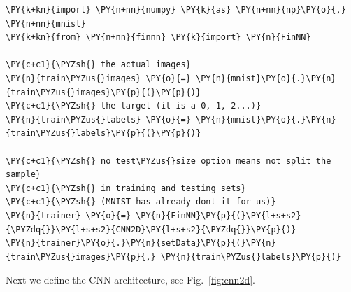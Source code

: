 \begin{codebox}[breakable, size=fbox, boxrule=1pt, pad at break*=1mm,colback=cellbackground, colframe=cellborder]
\begin{Verbatim}[commandchars=\\\{\}]
\PY{k+kn}{import} \PY{n+nn}{numpy} \PY{k}{as} \PY{n+nn}{np}\PY{o}{,} \PY{n+nn}{mnist}
\PY{k+kn}{from} \PY{n+nn}{finnn} \PY{k}{import} \PY{n}{FinNN}
	
\PY{c+c1}{\PYZsh{} the actual images}
\PY{n}{train\PYZus{}images} \PY{o}{=} \PY{n}{mnist}\PY{o}{.}\PY{n}{train\PYZus{}images}\PY{p}{(}\PY{p}{)} 
\PY{c+c1}{\PYZsh{} the target (it is a 0, 1, 2...)}
\PY{n}{train\PYZus{}labels} \PY{o}{=} \PY{n}{mnist}\PY{o}{.}\PY{n}{train\PYZus{}labels}\PY{p}{(}\PY{p}{)} 
	
\PY{c+c1}{\PYZsh{} no test\PYZus{}size option means not split the sample}
\PY{c+c1}{\PYZsh{} in training and testing sets}
\PY{c+c1}{\PYZsh{} (MNIST has already dont it for us)}
\PY{n}{trainer} \PY{o}{=} \PY{n}{FinNN}\PY{p}{(}\PY{l+s+s2}{\PYZdq{}}\PY{l+s+s2}{CNN2D}\PY{l+s+s2}{\PYZdq{}}\PY{p}{)}
\PY{n}{trainer}\PY{o}{.}\PY{n}{setData}\PY{p}{(}\PY{n}{train\PYZus{}images}\PY{p}{,} \PY{n}{train\PYZus{}labels}\PY{p}{)}
\end{Verbatim}
\end{codebox}

Next we define the CNN architecture, see Fig.~\ref{fig:cnn2d}.

